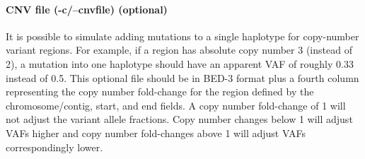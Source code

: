 \documentclass[letterpaper,11pt]{article}
\begin{document}
\paragraph{CNV file (-c/--cnvfile) (optional)}
	It is possible to simulate adding mutations to a single haplotype for copy-number variant regions. For example, if a region has absolute copy number 3 (instead of 2), a mutation into one haplotype should have an apparent VAF of roughly 0.33 instead of 0.5. This optional file should be in BED-3 format plus a fourth column representing the copy number fold-change for the region defined by the chromosome/contig, start, and end fields. A copy number fold-change of 1 will not adjust the variant allele fractions. Copy number changes below 1 will adjust VAFs higher and copy number fold-changes above 1 will adjust VAFs correspondingly lower.
\end{document}
